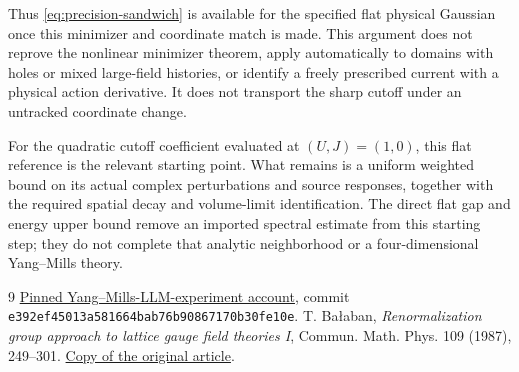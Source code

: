 \documentclass[11pt]{article}
\theoremstyle{remark}
\begin{document}
Thus \eqref{eq:precision-sandwich} is available for the specified
flat physical Gaussian once this minimizer and coordinate match
is made. This argument does not reprove the nonlinear minimizer
theorem, apply automatically to domains with holes or mixed large-field
histories, or identify a freely prescribed current with a physical
action derivative. It does not transport the sharp cutoff under
an untracked coordinate change.

For the quadratic cutoff coefficient evaluated at $(U,J)=(1,0)$,
this flat reference is the relevant starting point. What remains
is a uniform weighted bound on its actual complex perturbations
and source responses, together with the required spatial decay and
volume-limit identification. The direct flat gap and energy upper
bound remove an imported spectral estimate from this starting step;
they do not complete that analytic neighborhood or a four-dimensional
Yang--Mills theory.

\begin{thebibliography}{9}
 \href{https://github.com/ethanwsussman/Yang--Mills-LLM-experiment/tree/e392ef45013a581664bab76b90867170b30fe10e}
{Pinned Yang--Mills-LLM-experiment account}, commit
\texttt{e392ef45013a581664bab76b90867170b30fe10e}.
 T. Ba\l aban,
\emph{Renormalization group approach to lattice gauge field theories I},
Commun. Math. Phys. 109 (1987), 249--301.
\href{https://scispace.com/pdf/renormalization-group-approach-to-lattice-gauge-field-3ygai0vxt1.pdf}
{Copy of the original article}.
\end{thebibliography}
\end{document}
